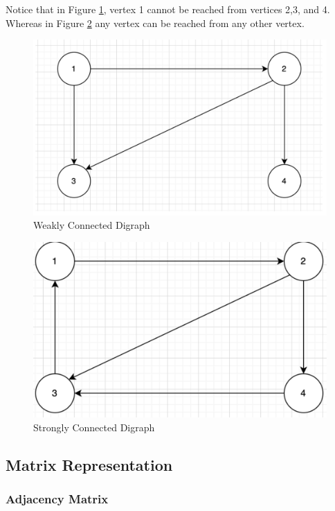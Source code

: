 \documentclass{article}
\theoremstyle{plain}%
\theoremstyle{definition}
\theoremstyle{remark}
\begin{document}
	Notice that in Figure \ref{fig-weakly-connected}, vertex 1 cannot be reached from vertices 2,3, and 4. Whereas in Figure \ref{fig-strongly-connected} any vertex can be reached from any other vertex.

	\begin{figure}[htbp]
		\center
		\includegraphics[scale=0.4]{img/weakly-connected.png}
		\caption{Weakly Connected Digraph}
		\label{fig-weakly-connected}
	\end{figure}

	\begin{figure}[htbp]
		\center
		\includegraphics[scale=0.4]{img/strongly-connected.png}
		\caption{Strongly Connected Digraph}
		\label{fig-strongly-connected}
	\end{figure}

	\subsection{Matrix Representation}

	\subsubsection{Adjacency Matrix}
\end{document}
